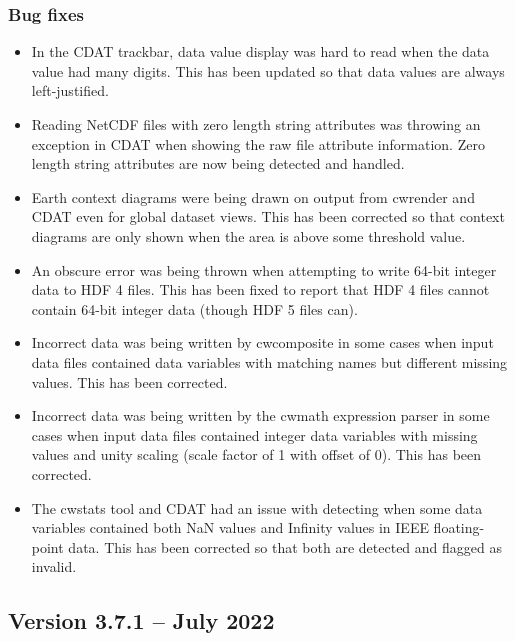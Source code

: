 \subsubsection*{ Bug fixes}
\begin{itemize}

\item In the CDAT trackbar, data value display was hard to read when the
data value had many digits.  This has been updated so that data values are 
always left-justified.

\item Reading NetCDF files with zero length string attributes was throwing
an exception in CDAT when showing the raw file attribute information.  Zero
length string attributes are now being detected and handled.

\item Earth context diagrams were being drawn on output from cwrender and
CDAT even for global dataset views.  This has been corrected so that context
diagrams are only shown when the area is above some threshold value.

\item An obscure error was being thrown when attempting to write 64-bit integer
data to HDF 4 files.  This has been fixed to report that HDF 4 files cannot 
contain 64-bit integer data (though HDF 5 files can).

\item Incorrect data was being written by cwcomposite in some cases when input
data files contained data variables with matching names but different missing 
values.  This has been corrected.

\item Incorrect data was being written by the cwmath expression parser in 
some cases when input data files contained integer data variables with 
missing values and unity scaling (scale factor of 1 with offset of 0).  This 
has been corrected.

\item The cwstats tool and CDAT had an issue with detecting when some data 
variables contained both NaN values and Infinity values in IEEE 
floating-point data.  This has been corrected so that both are detected 
and flagged as invalid.

\end{itemize}


\subsection*{Version 3.7.1 -- July 2022}

